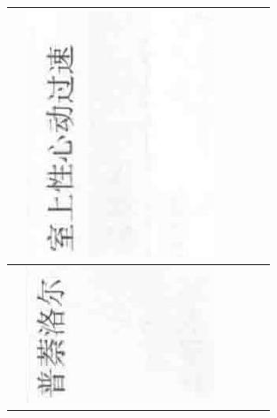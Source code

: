 \documentclass[10pt]{article}
\begin{document}
\begin{center}
\begin{tabular}{|c|c|c|c|c|c|}
 & \includegraphics[max width=\textwidth]{2024_07_05_645bb794a4d4f32ee0c8g-352(17)}
 \\
\hline
 & \includegraphics[max width=\textwidth]{2024_07_05_645bb794a4d4f32ee0c8g-352(20)}

\end{tabular}
\end{center}
\end{document}
